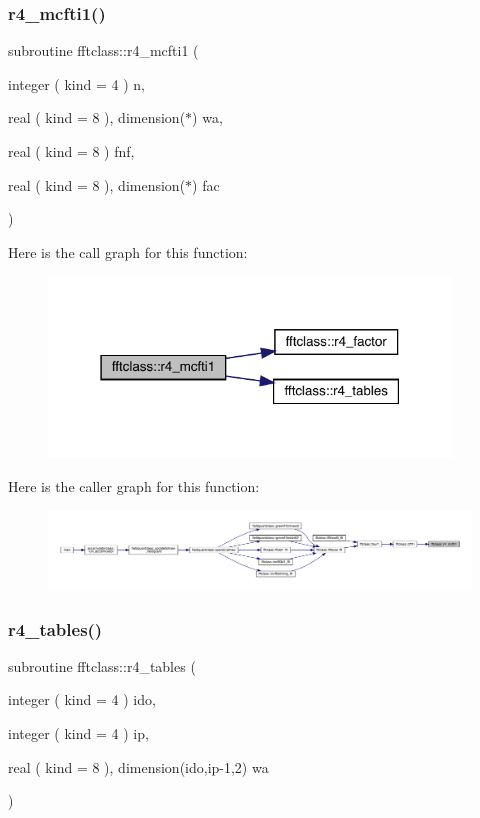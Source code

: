 \subsubsection{\texorpdfstring{r4\_mcfti1()}{r4\_mcfti1()}}
{\footnotesize\ttfamily subroutine fftclass\+::r4\+\_\+mcfti1 (\begin{DoxyParamCaption}\item[{integer ( kind = 4 )}]{n,  }\item[{real ( kind = 8 ), dimension($\ast$)}]{wa,  }\item[{real ( kind = 8 )}]{fnf,  }\item[{real ( kind = 8 ), dimension($\ast$)}]{fac }\end{DoxyParamCaption})}

Here is the call graph for this function\+:\nopagebreak
\begin{figure}[H]
\begin{center}
\leavevmode
\includegraphics[width=303pt]{namespacefftclass_aecf4238ff306578dd37cab143ce6efac_cgraph}
\end{center}
\end{figure}
Here is the caller graph for this function\+:\nopagebreak
\begin{figure}[H]
\begin{center}
\leavevmode
\includegraphics[width=350pt]{namespacefftclass_aecf4238ff306578dd37cab143ce6efac_icgraph}
\end{center}
\end{figure}
\mbox{\label{namespacefftclass_a882cd8d6eeb407d2b10ee9b3d9fee8b9}} 
\subsubsection{\texorpdfstring{r4\_tables()}{r4\_tables()}}
{\footnotesize\ttfamily subroutine fftclass\+::r4\+\_\+tables (\begin{DoxyParamCaption}\item[{integer ( kind = 4 )}]{ido,  }\item[{integer ( kind = 4 )}]{ip,  }\item[{real ( kind = 8 ), dimension(ido,ip-\/1,2)}]{wa }\end{DoxyParamCaption})}

